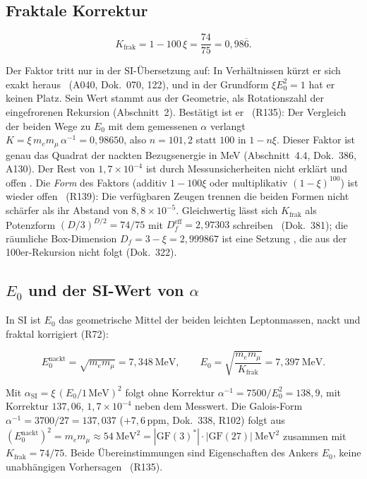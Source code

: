 \subsection{Fraktale Korrektur}

\begin{ffkern}
\begin{equation}
  K_{\text{frak}}=1-100\,\xi=\frac{74}{75}=0{,}98\overline{6}.
\end{equation}
\end{ffkern}%
Der Faktor tritt nur in der SI-Übersetzung auf: In Verhältnissen kürzt er sich exakt heraus
\BM\ (A040, Dok.~070, 122), und in der Grundform $\xi E_0^2=1$ hat er keinen Platz. Sein Wert
stammt aus der Geometrie, als Rotationszahl der eingefrorenen Rekursion (Abschnitt~2). Bestätigt
ist er \KM\ (R135): Der Vergleich der beiden Wege zu $E_0$ mit dem gemessenen $\alpha$ verlangt
$K=\xi\,m_em_\mu\,\alpha^{-1}=0{,}98650$, also $n=101{,}2$ statt $100$ in $1-n\xi$. Dieser Faktor
ist genau das Quadrat der nackten Bezugsenergie in MeV (Abschnitt~4.4, Dok.~386, A130). Der Rest
von $1{,}7\times10^{-4}$ ist durch Messunsicherheiten nicht erklärt und offen \SM. Die
\emph{Form} des Faktors (additiv $1-100\xi$ oder multiplikativ $(1-\xi)^{100}$) ist wieder offen
\SM\ (R139): Die verfügbaren Zeugen trennen die beiden Formen nicht schärfer als ihr Abstand von
$8{,}8\times10^{-5}$. Gleichwertig lässt sich $K_{\text{frak}}$ als Potenzform
$(D/3)^{D/2}=74/75$ mit $D_f^{\text{eff}}=2{,}97303$ schreiben \KM\ (Dok.~381); die räumliche
Box-Dimension $D_f=3-\xi=2{,}999867$ ist eine Setzung \SM, die aus der 100er-Rekursion nicht
folgt (Dok.~322).

\subsection{\texorpdfstring{$E_0$}{E0} und der SI-Wert von \texorpdfstring{$\alpha$}{alpha}}

In SI ist $E_0$ das geometrische Mittel der beiden leichten Leptonmassen, nackt und fraktal
korrigiert (R72):
\begin{ffkern}
\begin{equation}
  E_0^{\text{nackt}}=\sqrt{m_em_\mu}=7{,}348\ \text{MeV},\qquad
  E_0=\sqrt{\frac{m_em_\mu}{K_{\text{frak}}}}=7{,}397\ \text{MeV}.
\end{equation}
\end{ffkern}%
Mit $\alpha_{\text{SI}}=\xi\,(E_0/1\,\text{MeV})^2$ folgt ohne Korrektur $\alpha^{-1}=7500/E_0^2=138{,}9$,
mit Korrektur $137{,}06$, $1{,}7\times10^{-4}$ neben dem Messwert. Die Galois-Form
$\alpha^{-1}=3700/27=137{,}037$ ($+7{,}6$\,ppm, Dok.~338, R102) folgt aus
$(E_0^{\text{nackt}})^2=m_em_\mu\approx54\ \text{MeV}^2=|\mathrm{GF}(3)^*|\cdot|\mathrm{GF}(27)|\ \text{MeV}^2$
zusammen mit $K_{\text{frak}}=74/75$. Beide Übereinstimmungen sind Eigenschaften des Ankers
$E_0$, keine unabhängigen Vorhersagen \KM\ (R135).

